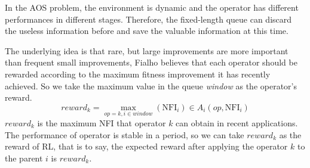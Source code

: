 \documentclass[journal]{IEEEtran}
\begin{document}
In the AOS problem, the environment is dynamic and the operator has different performances in different stages. Therefore, the fixed-length queue can discard the useless information before and save the valuable information at this time.

The underlying idea is that rare, but large improvements are more important than frequent small improvements, Fialho \cite{fialho2010comparison} believes that each operator should be rewarded according to the maximum fitness improvement it has recently achieved.
So we take the maximum value in the queue \textit{window} as the operator's reward.
\begin{equation}
    reward_k = \max_{op=k, i\in \textit{window}}(\text{NFI}_i) \in A_i(op,\text{NFI}_i)
\end{equation}
$reward_k$ is the maximum NFI that operator $k$ can obtain in recent applications.
The performance of operator is stable in a period, so we can take $reward_k$ as the reward of RL, that is to say, the expected reward after applying the operator $k$ to the parent $i$ is $reward_k$.
\end{document}
